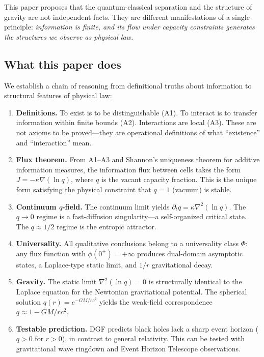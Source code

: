 \documentclass[reprint]{revtex4-2}
\begin{document}
This paper proposes that the quantum-classical separation and the structure of gravity are not independent facts. They are different manifestations of a single principle: \emph{information is finite, and its flow under capacity constraints generates the structures we observe as physical law.}

\subsection{What this paper does}

We establish a chain of reasoning from definitional truths about information to structural features of physical law:

\begin{enumerate}
\item \textbf{Definitions.} To exist is to be distinguishable (A1). To interact is to transfer information within finite bounds (A2). Interactions are local (A3). These are not axioms to be proved---they are operational definitions of what ``existence'' and ``interaction'' mean.

\item \textbf{Flux theorem.} From A1--A3 and Shannon's uniqueness theorem for additive information measures, the information flux between cells takes the form $J = -\kappa\nabla(\ln q)$, where $q$ is the vacant capacity fraction. This is the unique form satisfying the physical constraint that $q=1$ (vacuum) is stable.

\item \textbf{Continuum $q$-field.} The continuum limit yields $\partial_t q = \kappa\nabla^2(\ln q)$. The $q\to 0$ regime is a fast-diffusion singularity---a self-organized critical state. The $q\approx 1/2$ regime is the entropic attractor.

\item \textbf{Universality.} All qualitative conclusions belong to a universality class $\Phi$: any flux function with $\phi(0^+)=+\infty$ produces dual-domain asymptotic states, a Laplace-type static limit, and $1/r$ gravitational decay.

\item \textbf{Gravity.} The static limit $\nabla^2(\ln q)=0$ is structurally identical to the Laplace equation for the Newtonian gravitational potential. The spherical solution $q(r)=e^{-GM/rc^2}$ yields the weak-field correspondence $q\approx 1-GM/rc^2$.

\item \textbf{Testable prediction.} DGF predicts black holes lack a sharp event horizon ($q>0$ for $r>0$), in contrast to general relativity. This can be tested with gravitational wave ringdown and Event Horizon Telescope observations.
\end{enumerate}
\end{document}
